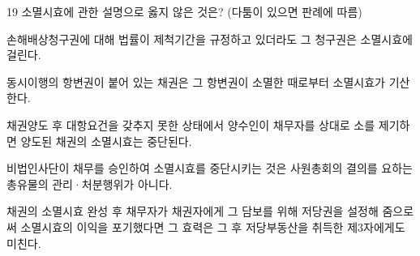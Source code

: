 \begin{question}{19}
소멸시효에 관한 설명으로 옳지 않은 것은? (다툼이 있으면 판례에 따름)
\begin{choices}
  \item 손해배상청구권에 대해 법률이 제척기간을 규정하고 있더라도 그 청구권은 소멸시효에 걸린다.
  \item 동시이행의 항변권이 붙어 있는 채권은 그 항변권이 소멸한 때로부터 소멸시효가 기산한다.
  \item 채권양도 후 대항요건을 갖추지 못한 상태에서 양수인이 채무자를 상대로 소를 제기하면 양도된 채권의 소멸시효는 중단된다.
  \item 비법인사단이 채무를 승인하여 소멸시효를 중단시키는 것은 사원총회의 결의를 요하는 총유물의 관리·처분행위가 아니다.
  \item 채권의 소멸시효 완성 후 채무자가 채권자에게 그 담보를 위해 저당권을 설정해 줌으로써 소멸시효의 이익을 포기했다면 그 효력은 그 후 저당부동산을 취득한 제3자에게도 미친다.
\end{choices}
\end{question}
